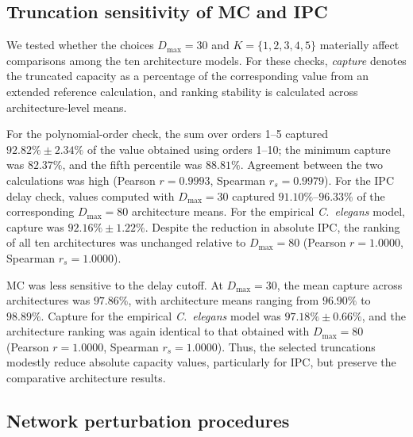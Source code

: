 \documentclass[a4paper,fleqn]{style_neural_networks/cas-dc}
\begin{document}
\subsection{Truncation sensitivity of MC and IPC}
\label{supp:metric_truncation}
We tested whether the choices \(D_{\max}=30\) and \(K=\{1,2,3,4,5\}\) materially affect comparisons among the ten architecture models. For these checks, \textit{capture} denotes the truncated capacity as a percentage of the corresponding value from an extended reference calculation, and ranking stability is calculated across architecture-level means.

For the polynomial-order check, the sum over orders 1--5 captured \(92.82\%\pm2.34\%\) of the value obtained using orders 1--10; the minimum capture was \(82.37\%\), and the fifth percentile was \(88.81\%\). Agreement between the two calculations was high (Pearson \(r=0.9993\), Spearman \(r_s=0.9979\)).
For the IPC delay check, values computed with \(D_{\max}=30\) captured \(91.10\%\)--\(96.33\%\) of the corresponding \(D_{\max}=80\) architecture means. For the empirical \textit{C.\ elegans} model, capture was \(92.16\%\pm1.22\%\). Despite the reduction in absolute IPC, the ranking of all ten architectures was unchanged relative to \(D_{\max}=80\) (Pearson \(r=1.0000\), Spearman \(r_s=1.0000\)).

MC was less sensitive to the delay cutoff. At \(D_{\max}=30\), the mean capture across architectures was \(97.86\%\), with architecture means ranging from \(96.90\%\) to \(98.89\%\). Capture for the empirical \textit{C.\ elegans} model was \(97.18\%\pm0.66\%\), and the architecture ranking was again identical to that obtained with \(D_{\max}=80\) (Pearson \(r=1.0000\), Spearman \(r_s=1.0000\)). Thus, the selected truncations modestly reduce absolute capacity values, particularly for IPC, but preserve the comparative architecture results.

\subsection{Network perturbation procedures}
\label{supp:perturbation_procedures}
\end{document}
